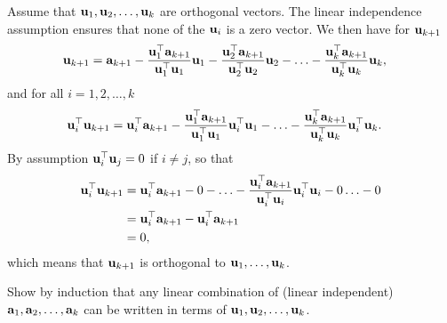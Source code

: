 \begin{exenumerate}
\begin{solution}
   Assume that $\mathbf{u}_1, \mathbf{u}_2, \ldots, \mathbf{u}_k$ are orthogonal vectors. The linear independence assumption ensures that none of the
   $\mathbf{u}_i$ is a zero vector. We then have for $\mathbf{u}_{k+1}$
    \begin{align}
      \mathbf{u}_{k+1} &= \mathbf{a}_{k+1} - \frac{\mathbf{u}_1^\top\mathbf{a}_{k+1}}{\mathbf{u}_1^\top\mathbf{u}_1}\mathbf{u}_1 - \frac{\mathbf{u}_2^\top\mathbf{a}_{k+1}}{\mathbf{u}_2^\top\mathbf{u}_2}\mathbf{u}_2
                 - \ldots - \frac{\mathbf{u}_k^\top\mathbf{a}_{k+1}}{\mathbf{u}_k^\top\mathbf{u}_k}\mathbf{u}_k,
                 \label{eq:u_k+1}
    \end{align}
    and for all $i = 1, 2, \ldots, k$
    \begin{align}
      \mathbf{u}_i^\top\mathbf{u}_{k+1} &= \mathbf{u}_i^\top\mathbf{a}_{k+1} - \frac{\mathbf{u}_1^\top\mathbf{a}_{k+1}}{\mathbf{u}_1^\top\mathbf{u}_1}\mathbf{u}_i^\top\mathbf{u}_1 - 
                          \ldots - \frac{\mathbf{u}_k^\top\mathbf{a}_{k+1}}{\mathbf{u}_k^\top\mathbf{u}_k}\mathbf{u}_i^\top\mathbf{u}_k.
    \end{align}
    By assumption $\mathbf{u}_i^\top\mathbf{u}_j = 0$ if $i \neq j$, so that
    \begin{align}
      \mathbf{u}_i^\top\mathbf{u}_{k+1} &= \mathbf{u}_i^\top\mathbf{a}_{k+1} - 0 - \ldots - \frac{\mathbf{u}_i^\top\mathbf{a}_{k+1}}{\mathbf{u}_i^\top\mathbf{u}_i}\mathbf{u}_i^\top\mathbf{u}_i - 0 \ldots - 0 \\
                        &= \mathbf{u}_i^\top\mathbf{a}_{k+1} - \mathbf{u}_i^\top\mathbf{a}_{k+1} \\
                        &= 0,
    \end{align}
    which means that $\mathbf{u}_{k+1}$ is orthogonal to $\mathbf{u}_1, \ldots, \mathbf{u}_k$.
    
  \end{solution}

\item Show by induction that any linear combination of (linear independent)
  $\mathbf{a}_1, \mathbf{a}_2, \ldots, \mathbf{a}_k$ can be written in terms of $\mathbf{u}_1, \mathbf{u}_2, \ldots,
  \mathbf{u}_k$.
  

\end{exenumerate}
